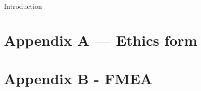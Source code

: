 \documentclass[oneside]{article}
\begin{document}

	\tableofcontents
	\clearpage
	\listoffigures
	\clearpage
{}

		{Introduction}
	\clearpage
	
	
\clearpage
	\section{Appendix A --- Ethics form} \label{sec:appendix-ethics}
		
	\section[]{Appendix B - FMEA} \label{sec:appendix-FMEA}
		
\end{document}
